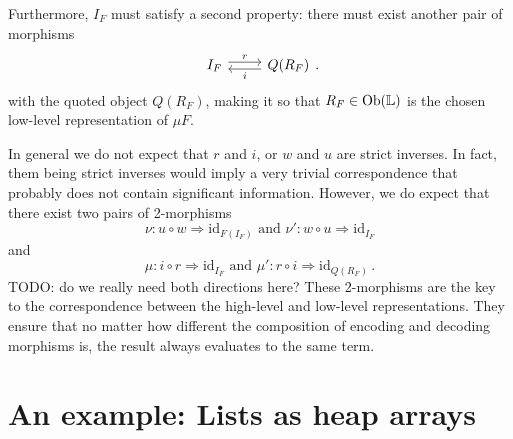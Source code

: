Furthermore, $I_F$ must satisfy a second property: there must exist another
pair of morphisms
\begin{equation}
  \begin{tikzcd}
    I_F \arrow[r, "r", shift left] & Q(R_F) \arrow[l, "i", shift left]
  \end{tikzcd}.
\end{equation}
with the quoted object $Q(R_F)$, making it so that $R_F \in \mathrm{Ob}(\mathbb{L})$ is the chosen low-level
representation of $\mu F$.

In general we do not expect that $r$ and $i$, or $w$ and $u$ are strict
inverses. In fact, them being strict inverses would imply a very trivial
correspondence that probably does not contain significant information. However,
we do expect that there exist two pairs of 2-morphisms
\begin{equation}
  \nu : u \circ w \Rightarrow \mathrm{id}_{F(I_F)} \text{ and } \nu' : w \circ u \Rightarrow \mathrm{id}_{I_F}
\end{equation}
and
\begin{equation}
  \mu : i \circ r \Rightarrow \mathrm{id}_{I_F} \text{ and } \mu' : r \circ i \Rightarrow \mathrm{id}_{Q(R_F)} \,.
\end{equation}
TODO: do we really need both directions here?
These 2-morphisms are the key to the correspondence between the high-level and
low-level representations. They ensure that no matter how different the composition of
encoding and decoding morphisms is, the result always evaluates to the same term.


\section{An example: Lists as heap arrays}
